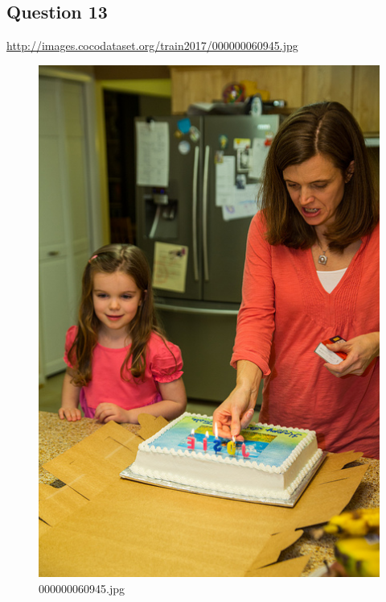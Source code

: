 \subsection*{Question 13}
\url{http://images.cocodataset.org/train2017/000000060945.jpg}
    \begin{figure}[h]
        \centering
        \includegraphics[width=0.8\linewidth]{../image set/easy/000000060945.jpg}
        \caption{000000060945.jpg}
    \end{figure}
